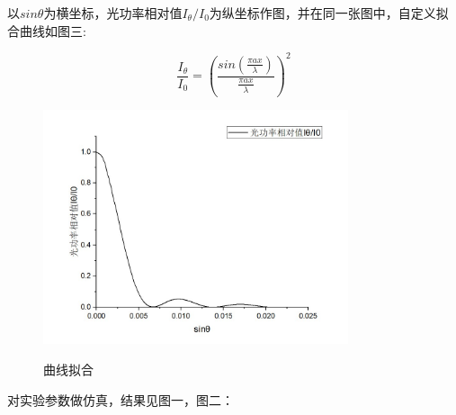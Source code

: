 \documentclass[12pt,a4paper,UTF8]{ctexart}
\begin{document}
以$sin\theta$为横坐标，光功率相对值$I_\theta/I_0$为纵坐标作图，并在同一张图中，自定义拟合曲线如图三:

\begin{equation*}
	\frac{I_{\theta}}{I_0}={\left(\frac{sin(\frac {\pi ax}{\lambda})}{\frac{\pi ax}{\lambda}}\right)}^2
\end{equation*}

\begin{figure}[htbp]
	\caption{曲线拟合}
	\centering
	\includegraphics[width=0.8\textwidth]{img//reg1.jpg}
	\label{fig:9}
\end{figure}

对实验参数做仿真，结果见图一，图二：
\end{document}
